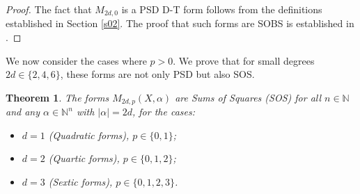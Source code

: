\documentclass{article}
\newtheorem{theorem}{Theorem}
\begin{document}
\begin{proof}
The fact that $M_{2d,0}$ is a PSD D-T form follows from the definitions established in Section \ref{s02}. 
The proof that such forms are SOBS is established in \cite{GM01}.
\end{proof}

We now consider the cases where $p > 0$. We prove that for small degrees $2d \in \{2, 4, 6\}$, these forms are not 
only PSD but also SOS.

\begin{theorem}\label{thm:M_2d_p_SOS}
The forms $M_{2d,p}(X, \alpha)$ are Sums of Squares (SOS) for all $n \in \mathbb{N}$ and any $\alpha \in \mathbb{N}^n$ 
with $|\alpha|=2d$, for the cases:
\begin{itemize}
    \item $d=1$ (Quadratic forms), $p \in \{0, 1\}$;
    \item $d=2$ (Quartic forms), $p \in \{0, 1, 2\}$;
    \item $d=3$ (Sextic forms), $p \in \{0, 1, 2, 3\}$.
\end{itemize}
\end{theorem}
\end{document}
